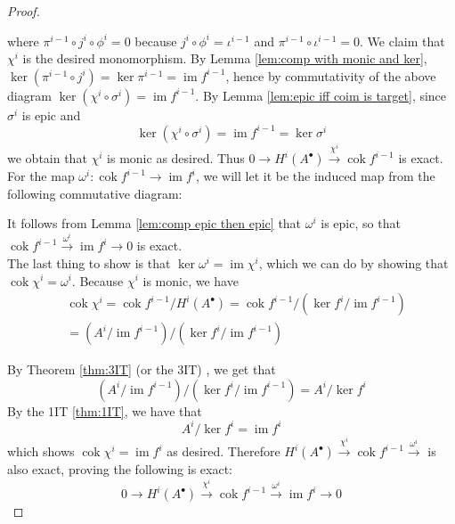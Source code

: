 \documentclass{article}
\DeclareMathOperator{\im}{im}
\DeclareMathOperator{\cok}{cok}
\begin{document}
\begin{proof}
    \begin{center}
    \end{center}
    where $\pi^{i-1}\circ j^i\circ \phi^i=0$ because $j^i\circ \phi^i=\iota^{i-1}$ and $\pi^{i-1}\circ \iota^{i-1}=0$.
    We claim that $\chi^i$ is the desired monomorphism. By Lemma \ref{lem:comp with monic and ker}, $\ker (\pi^{i-1}\circ j^i)=\ker \pi^{i-1}=\im f^{i-1}$, hence by commutativity of the above diagram $\ker (\chi^i \circ \sigma^i)=\im f^{i-1}$. By Lemma \ref{lem:epic iff coim is target}, since $\sigma^i$ is epic and
    \[
    \ker(\chi^i\circ \sigma^i)=\im f^{i-1}=\ker \sigma^i
    \]
    we obtain that $\chi^i$ is monic as desired. Thus $0\to H^i(A^\bullet)\xrightarrow{\chi^i}\cok f^{i-1}$ is exact.\\
    For the map $\omega^i:\cok f^{i-1}\to \im f^i$, we will let it be the induced map from the following commutative diagram:
    \begin{center}
    \end{center}
    It follows from Lemma \ref{lem:comp epic then epic} that $\omega^i$ is epic, so that $\cok f^{i-1}\xrightarrow{\omega^i}\im f^i\rightarrow 0$ is exact.\\
    The last thing to show is that $\ker \omega^i=\im \chi^i$, which we can do by showing that $\cok \chi^i=\omega^i$. Because $\chi^i$ is monic, we have 
    \begin{align*}
        &\cok \chi^i=\cok f^{i-1}/H^i(A^\bullet)=\cok f^{i-1}/(\ker f^i/\im f^{i-1})\\
        &=(A^i/\im f^{i-1})/(\ker f^i/ \im f^{i-1})
    \end{align*}
    
    
    By Theorem \ref{thm:3IT} (or the 3IT) , we get that
    \[
    (A^i/\im f^{i-1})/(\ker f^i/ \im f^{i-1})=A^i/\ker f^i
    \]
    By the 1IT \ref{thm:1IT}, we have that
    \[
    A^i/\ker f^i=\im f^i
    \]
    which shows $\cok \chi^i=\im f^i$ as desired. Therefore $H^i(A^\bullet) \xrightarrow{\chi^i} \cok f^{i-1} \xrightarrow{\omega^i}$ is also exact, proving the following is exact:
    \[
    0\rightarrow H^i(A^\bullet)\xrightarrow{\chi^i}\cok f^{i-1} \xrightarrow{\omega^i} \im f^i \rightarrow 0
    \]
\end{proof}
\end{document}
